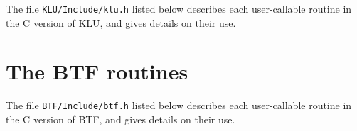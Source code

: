 \documentclass[11pt]{article}
\begin{document}
The file {\tt KLU/Include/klu.h} listed below describes each user-callable
routine in the C version of KLU, and gives details on their use.

{\footnotesize

}

\newpage
\section{The BTF routines}
\label{btf_include}

The file {\tt BTF/Include/btf.h} listed below describes each user-callable
routine in the C version of BTF, and gives details on their use.

{\footnotesize

}

\newpage



\end{document}
